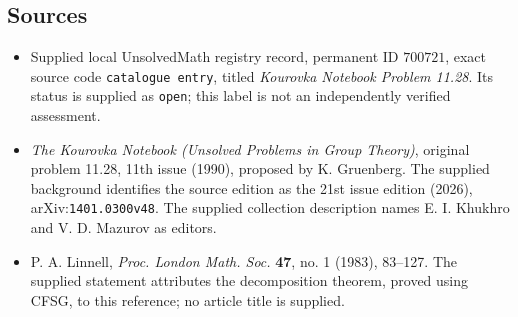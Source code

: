 \documentclass[11pt]{article}
\begin{document}
\subsection{Sources}
\begin{itemize}
\item Supplied local UnsolvedMath registry record, permanent ID \(700721\), exact source code \texttt{catalogue entry}, titled \emph{Kourovka Notebook Problem 11.28}. Its status is supplied as \texttt{open}; this label is not an independently verified assessment.
\item \emph{The Kourovka Notebook (Unsolved Problems in Group Theory)}, original problem 11.28, 11th issue (1990), proposed by K. Gruenberg. The supplied background identifies the source edition as the 21st issue edition (2026), arXiv:\texttt{1401.0300v48}. The supplied collection description names E. I. Khukhro and V. D. Mazurov as editors.
\item P. A. Linnell, \emph{Proc. London Math. Soc.} \textbf{47}, no. 1 (1983), 83--127. The supplied statement attributes the decomposition theorem, proved using CFSG, to this reference; no article title is supplied.
\end{itemize}
\end{document}
